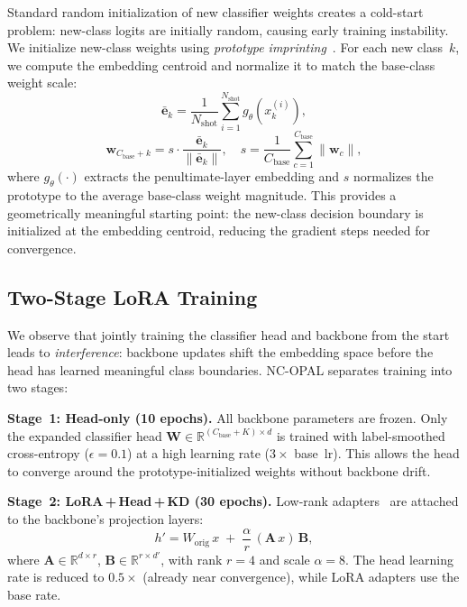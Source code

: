 \documentclass{Interspeech}
\begin{document}
Standard random initialization of new classifier weights creates a cold-start problem: new-class logits are initially random, causing early training instability.
We initialize new-class weights using \emph{prototype imprinting}~\cite{qi2018low}.
For each new class~$k$, we compute the embedding centroid and normalize it to match the base-class weight scale:
\begin{equation}
\bar{\mathbf{e}}_k = \frac{1}{N_\text{shot}} \sum_{i=1}^{N_\text{shot}} g_\theta\!\left(x_k^{(i)}\right),
\label{eq:centroid}
\end{equation}
\begin{equation}
\mathbf{w}_{C_\text{base}+k} = s \cdot \frac{\bar{\mathbf{e}}_k}{\lVert\bar{\mathbf{e}}_k\rVert},
\quad s = \frac{1}{C_\text{base}} \sum_{c=1}^{C_\text{base}} \lVert\mathbf{w}_c\rVert,
\label{eq:proto}
\end{equation}
where $g_\theta(\cdot)$ extracts the penultimate-layer embedding and $s$ normalizes the prototype to the average base-class weight magnitude.
This provides a geometrically meaningful starting point: the new-class decision boundary is initialized at the embedding centroid, reducing the gradient steps needed for convergence.

\subsection{Two-Stage LoRA Training}
\label{sec:twostage}

We observe that jointly training the classifier head and backbone from the start leads to \emph{interference}: backbone updates shift the embedding space before the head has learned meaningful class boundaries.
NC-OPAL separates training into two stages:

\smallskip\noindent\textbf{Stage~1: Head-only (10 epochs).}\quad
All backbone parameters are frozen.
Only the expanded classifier head $\mathbf{W}{\in}\mathbb{R}^{(C_\text{base}+K)\times d}$ is trained with label-smoothed cross-entropy ($\epsilon{=}0.1$) at a high learning rate ($3{\times}$ base~lr).
This allows the head to converge around the prototype-initialized weights without backbone drift.

\smallskip\noindent\textbf{Stage~2: LoRA\,+\,Head\,+\,KD (30 epochs).}\quad
Low-rank adapters~\cite{hu2022lora} are attached to the backbone's projection layers:
\begin{equation}
h' = W_\text{orig}\, x \;+\; \frac{\alpha}{r}\,(\mathbf{A}\, x)\,\mathbf{B},
\label{eq:lora}
\end{equation}
where $\mathbf{A}{\in}\mathbb{R}^{d \times r}$, $\mathbf{B}{\in}\mathbb{R}^{r \times d'}$, with rank $r{=}4$ and scale $\alpha{=}8$.
The head learning rate is reduced to $0.5{\times}$ (already near convergence), while LoRA adapters use the base rate.
\end{document}
